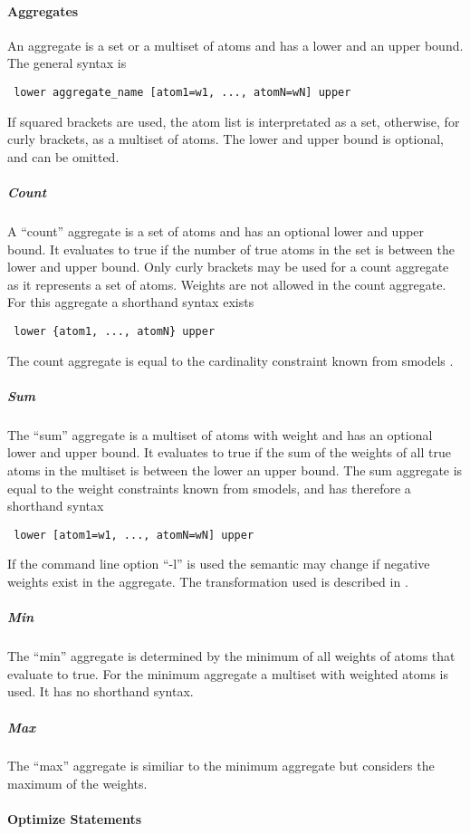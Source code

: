 \documentclass[a4paper,10pt]{article}
\begin{document}
\paragraph{Aggregates}
An aggregate is a set or a multiset of atoms and has a lower and an upper bound.
The general syntax is
\begin{verbatim}
 lower aggregate_name [atom1=w1, ..., atomN=wN] upper
\end{verbatim}
If squared brackets are used, the atom list is interpretated as a set, otherwise, for curly brackets, as a multiset of atoms.
The lower and upper bound is optional, and can be omitted.

\subparagraph{Count}
A ``count'' aggregate is a set of atoms and has an optional lower and upper bound.
It evaluates to true if the number of true atoms in the set is between the lower and upper bound. Only curly brackets may be used for a count aggregate as it represents a set of atoms.
Weights are not allowed in the count aggregate.
For this aggregate a shorthand syntax exists
\begin{verbatim}
 lower {atom1, ..., atomN} upper
\end{verbatim}
The count aggregate is equal to the cardinality constraint known from smodels \cite{smodels}.
\subparagraph{Sum}
The ``sum'' aggregate is a multiset of atoms with weight and has an optional lower and upper bound. It evaluates to true if the sum of the weights of all true atoms in the multiset is between the lower an upper bound.
The sum aggregate is equal to the weight constraints known from smodels, and has therefore a shorthand syntax
\begin{verbatim}
 lower [atom1=w1, ..., atomN=wN] upper
\end{verbatim}
If the command line option ``-l'' is used the semantic may change if negative weights exist in the aggregate. The transformation used is described in \cite{lparseManual}.

\subparagraph{Min}
The ``min'' aggregate is determined by the minimum of all weights of atoms that evaluate to true.
For the minimum aggregate a multiset with weighted atoms is used. It has no shorthand syntax.
\subparagraph{Max}
The ``max'' aggregate is similiar to the minimum aggregate but considers the maximum of the weights.

\paragraph{Optimize Statements}
\end{document}
